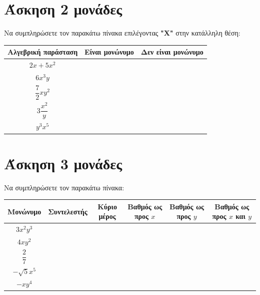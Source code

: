 \documentclass[a4paper,10pt]{report}
\begin{document}
\section*{Άσκηση 2  \hfill \small{ μονάδες}}
Να συμπληρώσετε τον παρακάτω πίνακα επιλέγοντας \textbf{"X"} στην κατάλληλη θέση:
\begin{center}
 \begin{tabular}{|c|c|c|}
\hline                   
        \textbf{Αλγεβρική παράσταση} &  \textbf{Είναι μονώνυμο} & \textbf{Δεν είναι μονώνυμο}     \\
\hline 
$2x+5x^{2}$                          &                          &        \\
\hline
$6x^{3}y$                            &                          &   \\
\hline
$\dfrac{7}{2}xy^{2}$                 &                          &   \\
\hline
$3\dfrac{x^{2}}{y}$                  &                          &   \\
\hline
$y^{3}x^{5}$                         &                           &  \\
\hline
\end{tabular}
\end{center}








\section*{Άσκηση 3  \hfill \small{ μονάδες}}
Να συμπληρώσετε τον παρακάτω πίνακα: 
\begin{center}
 \begin{tabular}{|c|c|c|c|c|c|}
\hline                   
 \textbf{Μονώνυμο}& \textbf{Συντελεστής} &\textbf{Κύριο μέρος} & \textbf{Βαθμός ως προς $x$}  &  \textbf{Βαθμός ως προς $y$}  & \textbf{Βαθμός ως προς $x$ και $y$}    \\
\hline 
$3x^{2}y^{3}$   &   &   & &  & \\
\hline
$4xy^{2}$   &   &   &   &  & \\
\hline
$\dfrac{2}{7}$ &  & &  &  & \\
\hline
$-\sqrt{5}x^{5}$ &  & & & & \\
\hline
$-xy^{4}$  & & & & & \\
\hline
\end{tabular}
\end{center}
\end{document}
